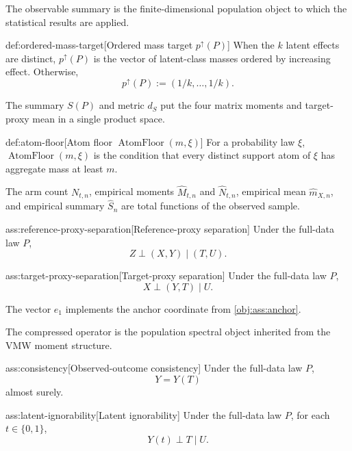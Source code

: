 \documentclass[11pt]{article}
\begin{document}
The observable summary is the finite-dimensional population object to which the statistical results are applied.

\begin{definitionv}{def:ordered-mass-target}[Ordered mass target \(p^{\uparrow}(P)\)]
When the \(k\) latent effects are distinct, \(p^{\uparrow}(P)\) is the vector of latent-class masses ordered by increasing effect. Otherwise,
\[
p^{\uparrow}(P) := (1/k,\ldots,1/k).
\]
\end{definitionv}

The summary \(S(P)\) and metric \(d_S\) put the four matrix moments and target-proxy mean in a single product space.

\begin{definitionv}{def:atom-floor}[Atom floor \(\operatorname{AtomFloor}(m,\xi)\)]
For a probability law \(\xi\), \(\operatorname{AtomFloor}(m,\xi)\) is the condition that every distinct support atom of \(\xi\) has aggregate mass at least \(m\).
\end{definitionv}

The arm count \(N_{t,n}\), empirical moments \(\widehat M_{t,n}\) and \(\widehat N_{t,n}\), empirical mean \(\widehat m_{X,n}\), and empirical summary \(\widehat S_n\) are total functions of the observed sample.

\begin{assumptionv}{ass:reference-proxy-separation}[Reference-proxy separation]
Under the full-data law \(P\),
\[
Z\perp (X,Y)\mid (T,U).
\]
\end{assumptionv}

\begin{assumptionv}{ass:target-proxy-separation}[Target-proxy separation]
Under the full-data law \(P\),
\[
X\perp (Y,T)\mid U.
\]
\end{assumptionv}

The vector \(e_1\) implements the anchor coordinate from \cref{obj:ass:anchor}.

The compressed operator is the population spectral object inherited from the VMW moment structure.

\begin{assumptionv}{ass:consistency}[Observed-outcome consistency]
Under the full-data law \(P\),
\[
Y=Y(T)
\]
almost surely.
\end{assumptionv}

\begin{assumptionv}{ass:latent-ignorability}[Latent ignorability]
Under the full-data law \(P\), for each \(t\in\{0,1\}\),
\[
Y(t)\perp T\mid U.
\]
\end{assumptionv}
\end{document}
